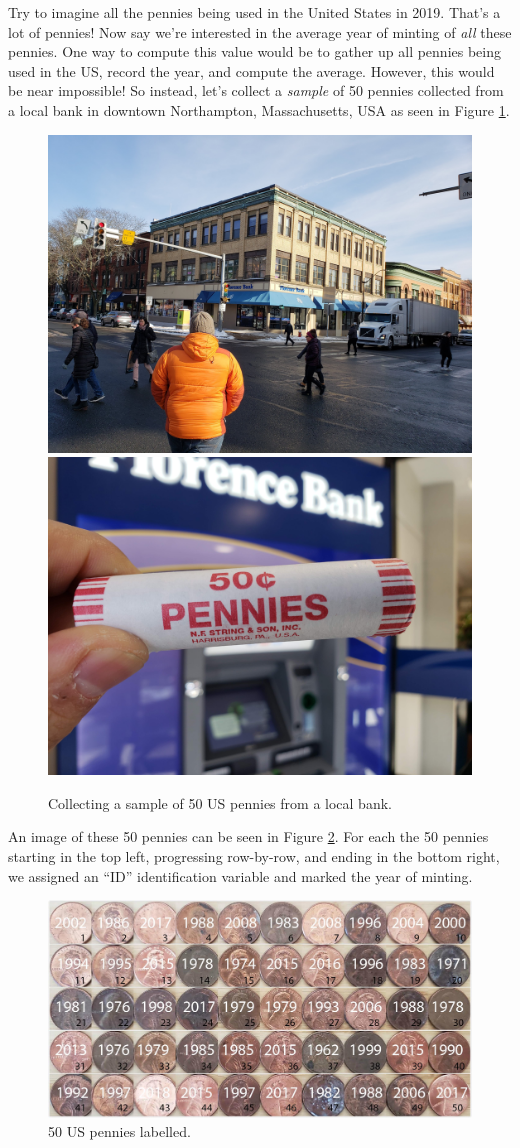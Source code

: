\documentclass[
]{book}
\begin{document}
Try to imagine all the pennies being used in the United States in 2019. That's a lot of pennies! Now say we're interested in the average year of minting of \emph{all} these pennies. One way to compute this value would be to gather up all pennies being used in the US, record the year, and compute the average. However, this would be near impossible! So instead, let's collect a \emph{sample} of 50 pennies collected from a local bank in downtown Northampton, Massachusetts, USA as seen in Figure \ref{fig:resampling-exercise-a}.

\begin{figure}
\includegraphics[width=0.4\linewidth]{images/sampling/pennies/bank} \includegraphics[width=0.4\linewidth]{images/sampling/pennies/roll} \caption{Collecting a sample of 50 US pennies from a local bank.}\label{fig:resampling-exercise-a}
\end{figure}

An image of these 50 pennies can be seen in Figure \ref{fig:resampling-exercise-c}. For each the 50 pennies starting in the top left, progressing row-by-row, and ending in the bottom right, we assigned an ``ID'' identification variable and marked the year of minting.

\begin{figure}
\includegraphics[width=1\linewidth]{images/sampling/pennies/deliverable/3} \caption{50 US pennies labelled.}\label{fig:resampling-exercise-c}
\end{figure}
\end{document}
